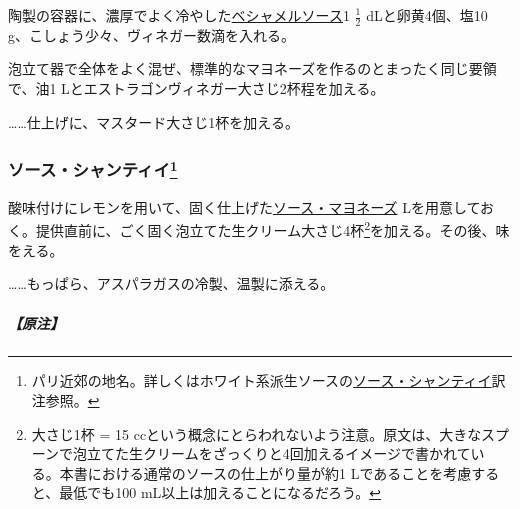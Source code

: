 \begin{recette}


陶製の容器に、濃厚でよく冷やした\protect\hyperlink{sauce-bechamel}{ベシャメルソース}1
\(\frac{1}{2}\) dLと卵黄4個、塩10
g、こしょう少々、ヴィネガー数滴を入れる。

泡立て器で全体をよく混ぜ、標準的なマヨネーズを作るのとまったく同じ要領で、油1
Lとエストラゴンヴィネガー大さじ2杯程を加える。

\ldots{}\ldots{}仕上げに、マスタード大さじ1杯を加える。

\hypertarget{sauce-chantilly-froide}{%
\subsubsection[ソース・シャンティイ]{\texorpdfstring{ソース・シャンティイ\footnote{パリ近郊の地名。詳しくはホワイト系派生ソースの\protect\hyperlink{sauce-chantilly}{ソース・シャンティイ}訳注参照。}}{ソース・シャンティイ}}\label{sauce-chantilly-froide}}



酸味付けにレモンを用いて、固く仕上げた\protect\hyperlink{mayonnaise}{ソース・マヨネーズ}\troisquarts{}
Lを用意しておく。提供直前に、ごく固く泡立てた生クリーム大さじ4杯\footnote{大さじ1杯
  = 15
  ccという概念にとらわれないよう注意。原文は、大きなスプーンで泡立てた生クリームをざっくりと4回加えるイメージで書かれている。本書における通常のソースの仕上がり量が約1
  Lであることを考慮すると、最低でも100 mL以上は加えることになるだろう。}を加える。その後、味をえる。

\ldots{}\ldots{}もっぱら、アスパラガスの冷製、温製に添える。

\hypertarget{nota-sauce-chantilly-froide}{%
\subparagraph{【原注】}\label{nota-sauce-chantilly-froide}}


\end{recette}
